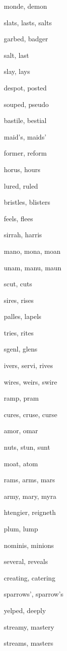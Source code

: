    \item monde, demon
    \item slats, lasts, salts
    \item garbed, badger
    \item salt, last
    \item slay, lays
    \item despot, posted
    \item souped, pseudo
    \item bastile, bestial
    \item maid's, maids'
    \item former, reform
    \item horus, hours
    \item lured, ruled
    \item bristles, blisters
    \item feels, flees
    \item sirrah, harris
    \item mano, mona, moan
    \item unam, manu, maun
    \item scut, cuts
    \item sires, rises
    \item palles, lapels
    \item tries, rites
    \item sgenl, glens
    \item ivers, servi, rives
    \item wires, weirs, swire
    \item ramp, pram
    \item cures, cruse, curse
    \item amor, omar
    \item nuts, stun, sunt
    \item moat, atom
    \item rams, arms, mars
    \item army, mary, myra
    \item htengier, reigneth
    \item plum, lump
    \item nominis, minions
    \item several, reveals
    \item creating, catering
    \item sparrows', sparrow's
    \item yelped, deeply
    \item streamy, mastery
    \item streams, masters
